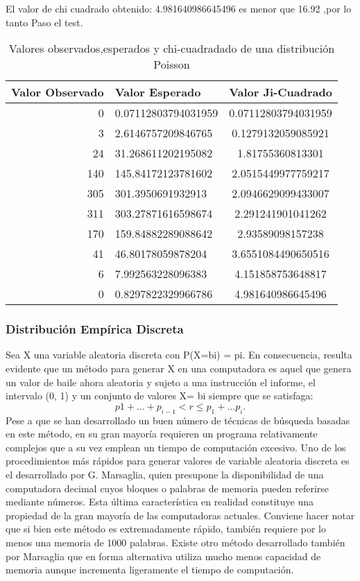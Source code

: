 \documentclass{article}
\begin{document}
    El valor de chi cuadrado obtenido: 4.981640986645496 es menor que 16.92 ,por lo tanto Paso el test.
\begin{table}[h]
\begin{center}
\begin{tabular}{| r | l | c |} \hline
Valor Observado & Valor Esperado &  Valor Ji-Cuadrado \\ \hline
0 & 0.07112803794031959 & 0.07112803794031959 \\
3 & 2.6146757209846765 & 0.1279132059085921 \\
24 & 31.268611202195082 & 1.81755360813301 \\
140 & 145.84172123781602 & 2.0515449977759217 \\
305 & 301.3950691932913 & 2.0946629099433007 \\
311 & 303.27871616598674 & 2.291241901041262 \\
170 & 159.84882289088642 & 2.93589098157238 \\
41 & 46.80178059878204 & 3.6551084490650516 \\
6 & 7.992563228096383 & 4.151858753648817 \\
0 & 0.8297822329966786 & 4.981640986645496 \\ \hline
\end{tabular}
\caption{Valores observados,esperados y chi-cuadradado de una distribución Poisson}
\end{center}
\end{table}







\subsubsection{Distribución Empírica Discreta}
  Sea X una variable aleatoria discreta con P(X=bi) = pi.
  En consecuencia, resulta evidente que un método para generar X en una computadora es aquel que genera un valor de
  baile ahora aleatoria y sujeto a una instrucción el informe, el intervalo (0, 1) y un conjunto de valores X= bi siempre
  que se satisfaga:
  \begin{equation}
    p1 + ... + p_{i-1} < r \leq p_{1} + ... p_{i}.
    \end{equation}
  Pese a que se han desarrollado un buen número de técnicas de búsqueda basadas en este método, en su gran mayoría
  requieren un programa relativamente complejos que a su vez emplean un tiempo de computación excesivo.
  Uno de los procedimientos más rápidos para generar valores de variable aleatoria discreta es el desarrollado por G.
  Marsaglia, quien presupone la disponibilidad de una computadora decimal cuyos bloques o palabras de memoria pueden
  referirse mediante números. Esta última característica en realidad constituye una propiedad de la gran mayoría de las
  computadoras actuales. Conviene hacer notar que si bien este método es extremadamente rápido, también requiere
  por lo menos una memoria de 1000 palabras. Existe otro método desarrollado también por Marsaglia que en forma
  alternativa utiliza mucho menos capacidad de memoria aunque incrementa ligeramente el tiempo de computación.
\end{document}
